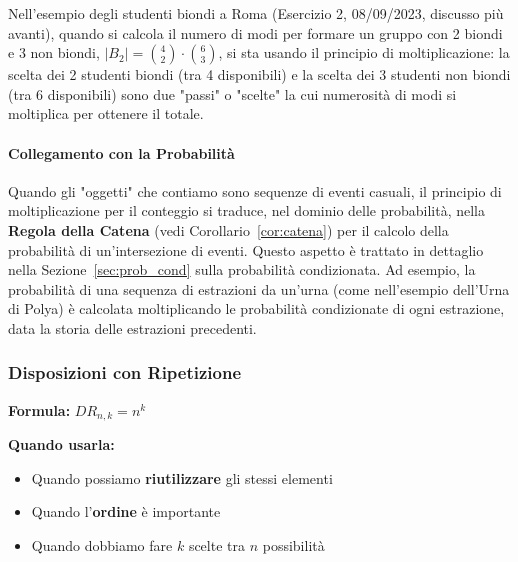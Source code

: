 Nell'esempio degli studenti biondi a Roma (Esercizio 2, 08/09/2023, discusso più avanti), quando si calcola il numero di modi per formare un gruppo con 2 biondi e 3 non biondi, $|B_2| = \binom{4}{2} \cdot \binom{6}{3}$, si sta usando il principio di moltiplicazione: la scelta dei 2 studenti biondi (tra 4 disponibili) e la scelta dei 3 studenti non biondi (tra 6 disponibili) sono due "passi" o "scelte" la cui numerosità di modi si moltiplica per ottenere il totale.

\paragraph{Collegamento con la Probabilità}
Quando gli "oggetti" che contiamo sono sequenze di eventi casuali, il principio di moltiplicazione per il conteggio si traduce, nel dominio delle probabilità, nella \textbf{Regola della Catena} (vedi Corollario~\ref{cor:catena}) per il calcolo della probabilità di un'intersezione di eventi. Questo aspetto è trattato in dettaglio nella Sezione~\ref{sec:prob_cond} sulla probabilità condizionata. Ad esempio, la probabilità di una sequenza di estrazioni da un'urna (come nell'esempio dell'Urna di Polya) è calcolata moltiplicando le probabilità condizionate di ogni estrazione, data la storia delle estrazioni precedenti.

\subsubsection{Disposizioni con Ripetizione}
\textbf{Formula:} $DR_{n,k} = n^k$

\textbf{Quando usarla:}
\begin{itemize}
    \item Quando possiamo \textbf{riutilizzare} gli stessi elementi
    \item Quando l'\textbf{ordine} è importante
    \item Quando dobbiamo fare $k$ scelte tra $n$ possibilità
\end{itemize}


